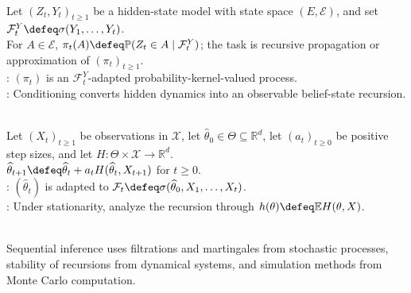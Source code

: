 \begin{definition} \label{def:filtering-problem} \\
Let $(Z_t,Y_t)_{t\geq1}$ be a hidden-state model with state space $(E,\mathcal{E})$, and set $\mathcal{F}_t^Y\defeq\sigma(Y_1,\ldots,Y_t)$.\\
For $A\in\mathcal{E}$, $\pi_t(A)\defeq\mathbb{P}(Z_t\in A\mid\mathcal{F}_t^Y)$; the task is recursive propagation or approximation of $(\pi_t)_{t\geq1}$.\\
: $(\pi_t)$ is an $\mathcal{F}_t^Y$-adapted probability-kernel-valued process.\\
: Conditioning converts hidden dynamics into an observable belief-state recursion.
\end{definition}

\begin{definition} \label{def:online-estimator-recursion} \\
Let $(X_t)_{t\geq1}$ be observations in $\mathcal{X}$, let $\widehat{\theta}_0\in\Theta\subseteq\mathbb{R}^d$, let $(a_t)_{t\geq0}$ be positive step sizes, and let $H:\Theta\times\mathcal{X}\to\mathbb{R}^d$.\\
$\widehat{\theta}_{t+1}\defeq\widehat{\theta}_t+a_tH(\widehat{\theta}_t,X_{t+1})$ for $t\geq0$.\\
: $(\widehat{\theta}_t)$ is adapted to $\mathcal{F}_t\defeq\sigma(\widehat{\theta}_0,X_1,\ldots,X_t)$.\\
: Under stationarity, analyze the recursion through $h(\theta)\defeq\mathbb{E}H(\theta,X)$.
\end{definition}

\begin{remark} \label{rem:sequential-cross-references} \\
Sequential inference uses filtrations and martingales from stochastic processes, stability of recursions from dynamical systems, and simulation methods from Monte Carlo computation.
\end{remark}
